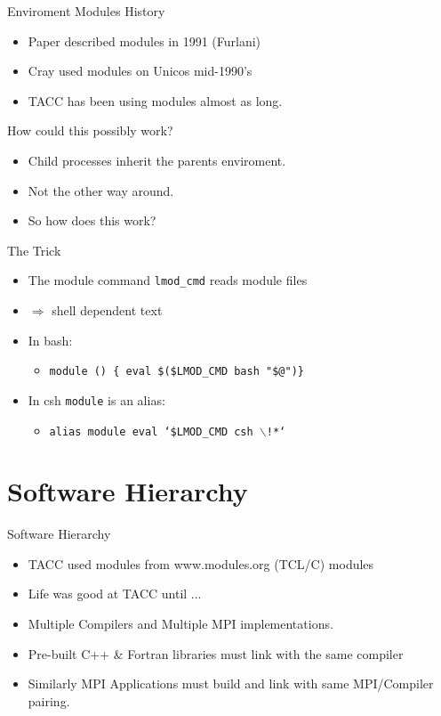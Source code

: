 \documentclass{beamer}
\begin{document}
\begin{frame}{Enviroment Modules History}
  \begin{itemize}
    \item Paper described modules in 1991 (Furlani)
    \item Cray used modules on Unicos mid-1990's
    \item TACC has been using modules almost as long.
  \end{itemize}
\end{frame}

\begin{frame}{How could this possibly work?}
  \begin{itemize}
    \item Child processes inherit the parents enviroment.
    \item Not the other way around.
    \item So how does this work?
  \end{itemize}
\end{frame}

\begin{frame}{The Trick}
  \begin{itemize}
    \item The module command \texttt{lmod\_cmd} reads module files
    \item $\Rightarrow$ shell dependent text
    \item In bash:
      \begin{itemize}
          \item \texttt{module () \{ eval \$(\$LMOD\_CMD bash "\$@")\}}
      \end{itemize}
    \item In csh \texttt{module} is an alias:
      \begin{itemize}
        \item \texttt{alias module eval `\$LMOD\_CMD csh $\backslash$!*`}
      \end{itemize}
  \end{itemize}
\end{frame}

\section{Software Hierarchy}

\begin{frame}{Software Hierarchy}
  \begin{itemize}
    \item TACC used modules from www.modules.org (TCL/C) modules
    \item Life was good at TACC until ...
    \item Multiple Compilers and Multiple MPI implementations.
    \item Pre-built C++ \& Fortran libraries must link with the same compiler
    \item Similarly MPI Applications must build and link with same
      MPI/Compiler pairing.
  \end{itemize}
\end{frame}
\end{document}
